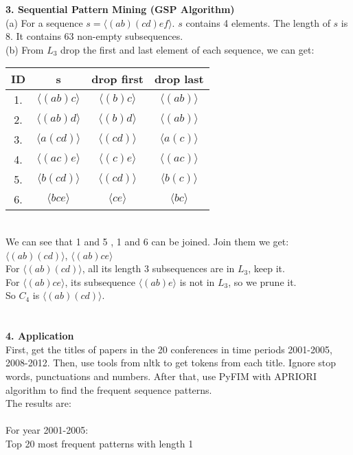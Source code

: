 \documentclass[11pt,a4paper,fleqn]{article}
\begin{document}
\newpage \noindent
\textbf{3. Sequential Pattern Mining (GSP Algorithm)}\\
(a) For a sequence $s=\langle (ab)(cd)ef\rangle $. $s$ contains 4 elements. The length of $s$ is 8. It contains 63 non-empty subsequences.\\
(b) From $L_3$ drop the first and last element of each sequence, we can get:\\
\begin{tabular}{|c|c|c|c|}
\hline
ID&s&drop first&drop last\\
\hline
1.&$\langle (ab)c\rangle $&$\langle (b)c\rangle $&$\langle (ab)\rangle $\\
2.&$\langle (ab)d\rangle $&$\langle (b)d\rangle $&$\langle (ab)\rangle $\\
3.&$\langle a(cd)\rangle $&$\langle (cd)\rangle $&$\langle a(c)\rangle $\\
4.&$\langle (ac)e\rangle $&$\langle (c)e\rangle $&$\langle (ac)\rangle $\\
5.&$\langle b(cd)\rangle $&$\langle (cd)\rangle $&$\langle b(c)\rangle $\\
6.&$\langle bce\rangle $&$\langle ce\rangle $&$\langle bc\rangle $\\
\hline
\end{tabular}\\
We can see that 1 and 5 , 1 and 6 can be joined. Join them we get:\\
$\langle (ab)(cd)\rangle $, $\langle (ab)ce\rangle $\\
For $\langle (ab)(cd)\rangle $, all its length 3 subsequences are in $L_3$, keep it.\\
For $\langle (ab)ce\rangle $, its subsequence $\langle (ab)e\rangle $ is not in $L_3$, so we prune it.\\
So $C_4$ is  $\langle (ab)(cd)\rangle $.\\ \\ \\
\textbf{4. Application}\\
First, get the titles of papers in the 20 conferences in time periods 2001-2005, 2008-2012. Then, use tools from nltk to get tokens from each title. Ignore stop words, punctuations and numbers. After that, use PyFIM with APRIORI algorithm to find the frequent sequence patterns. \\The results are:\\ \\ \noindent
For year 2001-2005:\\
Top 20 most frequent patterns with length 1
\end{document}
